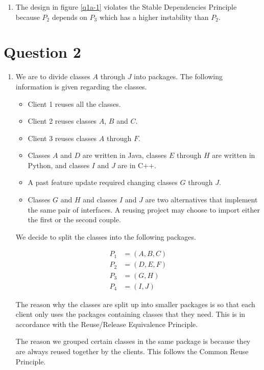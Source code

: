 \documentclass{article}
\begin{document}
\begin{enumerate}[label=\alph*.]
	\item
		The design in figure \ref{q1a-1} violates the Stable Dependencies Principle because \(P_2\) depends on \(P_3\) which has a higher instability than \(P_2\).
\end{enumerate}


\section*{Question 2}

\begin{enumerate}[label=\alph*.]
	\item
		We are to divide classes \(A\) through \(J\) into packages. The following information is given regarding the classes.
		\begin{itemize}
			\item Client 1 reuses all the classes.
			\item Client 2 reuses classes \(A\), \(B\) and \(C\).
			\item Client 3 reuses classes \(A\) through \(F\).
			\item Classes \(A\) and \(D\) are written in Java, classes \(E\) through \(H\) are written in Python, and classes \(I\) and \(J\) are in C++.
			\item A past feature update required changing classes \(G\) through \(J\).
			\item Classes \(G\) and \(H\) and classes \(I\) and \(J\) are two alternatives that implement the same pair of interfaces. A reusing project may choose to import either the first or the second couple.
		\end{itemize}

		We decide to split the classes into the following packages.

		\begin{align*}
			P_1 & = (A, B, C) \\
			P_2 & = (D, E, F) \\
			P_3 & = (G, H) \\
			P_4 & = (I, J)
		\end{align*}

		The reason why the classes are split up into smaller packages is so that each client only uses the packages containing classes that they need. This is in accordance with the Reuse/Release Equivalence Principle.

		The reason we grouped certain classes in the same package is because they are always reused together by the clients. This follows the Common Reuse Principle.


\end{enumerate}
\end{document}
